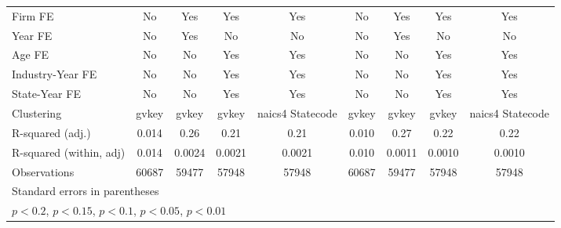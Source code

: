 {\begin{tabular}{l*{8}{c}}
\addlinespace
Firm FE             &          No         &         Yes         &         Yes         &         Yes         &          No         &         Yes         &         Yes         &         Yes         \\
\addlinespace
Year FE             &          No         &         Yes         &          No         &          No         &          No         &         Yes         &          No         &          No         \\
\addlinespace
Age FE              &          No         &          No         &         Yes         &         Yes         &          No         &          No         &         Yes         &         Yes         \\
\addlinespace
Industry-Year FE    &          No         &          No         &         Yes         &         Yes         &          No         &          No         &         Yes         &         Yes         \\
\addlinespace
State-Year FE       &          No         &          No         &         Yes         &         Yes         &          No         &          No         &         Yes         &         Yes         \\
\midrule
Clustering          &       gvkey         &       gvkey         &       gvkey         &naics4 Statecode         &       gvkey         &       gvkey         &       gvkey         &naics4 Statecode         \\
R-squared (adj.)    &       0.014         &        0.26         &        0.21         &        0.21         &       0.010         &        0.27         &        0.22         &        0.22         \\
R-squared (within, adj)&       0.014         &      0.0024         &      0.0021         &      0.0021         &       0.010         &      0.0011         &      0.0010         &      0.0010         \\
Observations        &       60687         &       59477         &       57948         &       57948         &       60687         &       59477         &       57948         &       57948         \\
\bottomrule
\multicolumn{9}{l}{\footnotesize Standard errors in parentheses}\\
\multicolumn{9}{l}{\footnotesize \sym{++} \(p<0.2\), \sym{+} \(p<0.15\), \sym{*} \(p<0.1\), \sym{**} \(p<0.05\), \sym{***} \(p<0.01\)}\\
\end{tabular}
}
